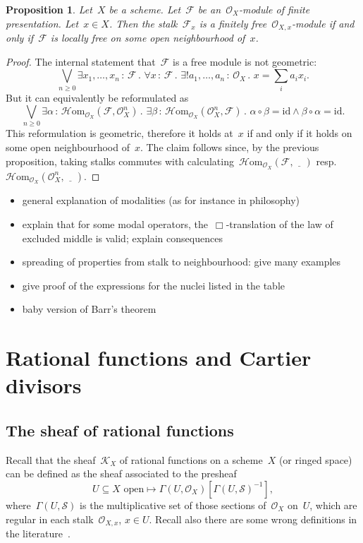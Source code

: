 \documentclass[10pt]{amsart}
\theoremstyle{definition}
\theoremstyle{plain}
\newtheorem{prop}[defn]{Proposition}
\theoremstyle{remark}
\newcommand{\F}{\mathcal{F}}
\newcommand{\G}{\mathcal{G}}
\renewcommand{\O}{\mathcal{O}}
\newcommand{\K}{\mathcal{K}}
\renewcommand{\S}{\mathcal{S}}
\newcommand{\HOM}{\mathcal{H}\mathrm{om}}
\newcommand{\id}{\mathrm{id}}
\newcommand{\placeholder}{\underline{\quad}}
\newcommand{\?}{\,{:}\,}
\renewcommand{\_}{\mathpunct{.}\,}
\begin{document}
\begin{prop}Let~$X$ be a scheme. Let~$\F$ be an~$\O_X$-module of finite
presentation. Let~$x \in X$. Then the stalk~$\F_x$ is a finitely
free~$\O_{X,x}$-module if and only if~$\F$ is locally free on some open
neighbourhood of~$x$.\end{prop}
\begin{proof}The internal statement that~$\F$ is a free module is not geometric:
\[ \bigvee_{n \geq 0}
  \exists x_1,\ldots,x_n\?\F\_
  \forall x\?\F\_
  \exists! a_1,\ldots,a_n\?\O_X\_
  x = \textstyle\sum_i a_i x_i. \]
But it can equivalently be reformulated as
\[ \bigvee_{n \geq 0}
  \exists \alpha\?\HOM_{\O_X}(\F,\O_X^n)\_
  \exists \beta\?\HOM_{\O_X}(\O_X^n,\F)\_
  \alpha \circ \beta = \id \wedge \beta \circ \alpha = \id. \]
This reformulation is geometric, therefore it holds at~$x$ if and only if it
holds on some open neighbourhood of~$x$. The claim follows since, by the
previous proposition, taking stalks commutes with
calculating~$\HOM_{\O_X}(\F,\placeholder)$ resp.~$\HOM_{\O_X}(\O_X^n,\placeholder)$.
\end{proof}

\begin{itemize}
\item general explanation of modalities (as for instance in philosophy)
\item explain that for some modal operators, the~$\Box$-translation of the law
of excluded middle is valid; explain consequences
\item spreading of properties from stalk to neighbourhood: give many examples
\item give proof of the expressions for the nuclei listed in the table
\item baby version of Barr's theorem
\end{itemize}


\section{Rational functions and Cartier divisors}

\subsection{The sheaf of rational functions} Recall that the sheaf~$\K_X$ of rational
functions on a scheme~$X$ (or ringed space) can be defined as the sheaf
associated to the presheaf
\[ \text{$U \subseteq X$ open} \longmapsto \Gamma(U,\O_X)[\Gamma(U,\S)^{-1}], \]
where~$\Gamma(U,\S)$ is the multiplicative set of those sections of~$\O_X$ on~$U$,
which are regular in each stalk~$\O_{X,x}$, $x \in U$. Recall also there are
some wrong definitions in the literature~\cite{kleiman:misconceptions}.
\end{document}

